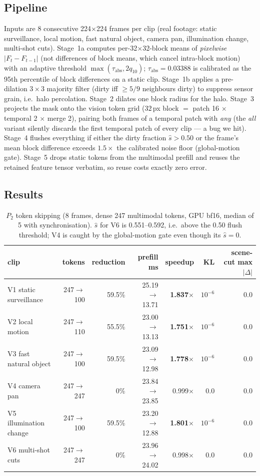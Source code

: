\documentclass[11pt]{article}
\begin{document}
\subsection{Pipeline}
Inputs are $8$ consecutive 224$\times$224 frames per clip (real footage: static
surveillance, local motion, fast natural object, camera pan, illumination change,
multi-shot cuts). Stage~1a computes per-32$\times$32-block means of \emph{pixelwise}
$|F_t-F_{t-1}|$ (not differences of block means, which cancel intra-block motion) with an
adaptive threshold $\max(\tau_{\mathrm{abs}}, 2q_{10})$; $\tau_{\mathrm{abs}}=0.03388$ is
calibrated as the 95th percentile of block differences on a static clip. Stage~1b applies a
pre-dilation $3\times3$ majority filter (dirty iff $\ge5/9$ neighbours dirty) to suppress
sensor grain, i.e.\ halo percolation. Stage~2 dilates one block radius for the halo.
Stage~3 projects the mask onto the vision token grid ($32$\,px block $=$ patch 16
$\times$ temporal 2 $\times$ merge 2), pairing both frames of a temporal patch with
\emph{any} (the \emph{all} variant silently discards the first temporal patch of every
clip --- a bug we hit). Stage~4 flushes everything if either the dirty fraction
$\hat s>0.50$ or the frame's mean block difference exceeds $1.5\times$ the calibrated
noise floor (global-motion gate). Stage~5 drops static tokens from the multimodal prefill
and reuses the retained feature tensor verbatim, so reuse costs exactly zero error.

\subsection{Results}
\begin{table}[h]\centering\small
\begin{tabular}{lrrrrrr}
\toprule
clip & tokens & reduction & prefill ms & speedup & KL & scene-cut max$|\Delta|$ \\
\midrule
V1 static surveillance & 247$\rightarrow$100 & 59.5\% & 25.19$\rightarrow$13.71 & \textbf{1.837$\times$} & $10^{-6}$ & 0.0 \\
V2 local motion        & 247$\rightarrow$110 & 55.5\% & 23.00$\rightarrow$13.13 & \textbf{1.751$\times$} & $10^{-6}$ & 0.0 \\
V3 fast natural object & 247$\rightarrow$100 & 59.5\% & 23.09$\rightarrow$12.98 & \textbf{1.778$\times$} & $10^{-6}$ & 0.0 \\
V4 camera pan          & 247$\rightarrow$247 & 0\%    & 23.84$\rightarrow$23.85 & 0.999$\times$ & 0.0 & 0.0 \\
V5 illumination change & 247$\rightarrow$100 & 59.5\% & 23.20$\rightarrow$12.88 & \textbf{1.801$\times$} & $10^{-6}$ & 0.0 \\
V6 multi-shot cuts     & 247$\rightarrow$247 & 0\%    & 23.96$\rightarrow$24.02 & 0.998$\times$ & 0.0 & 0.0 \\
\bottomrule
\end{tabular}
\caption{$P_2$ token skipping (8 frames, dense 247 multimodal tokens, GPU bf16, median of
5 with synchronisation). $\hat s$ for V6 is 0.551--0.592, i.e.\ above the 0.50 flush
threshold; V4 is caught by the global-motion gate even though its $\hat s=0$.}
\end{table}
\end{document}
